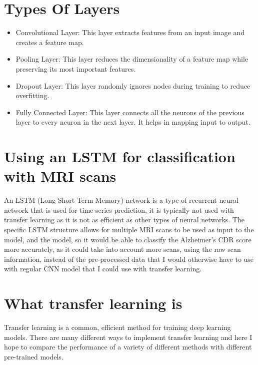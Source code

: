 \documentclass[]{final_report}
\begin{document}
\section{Types Of Layers}

\begin{itemize}
  \item Convolutional Layer: This layer extracts features from an input image and creates a feature map.

  \item  Pooling Layer: This layer reduces the dimensionality of a feature map while preserving its most important features.

  \item  Dropout Layer: This layer randomly ignores nodes during training to reduce overfitting.

  \item  Fully Connected Layer: This layer connects all the neurons of the previous layer to every neuron in the next layer. It helps in mapping input to output.
\end{itemize}


\section{Using an LSTM for classification with MRI scans}
An LSTM (Long Short Term Memory) network is a type of recurrent neural network that is used for time series prediction, it is typically not used with transfer learning as it is not as efficient as other types of neural networks. The specific LSTM structure allows for multiple MRI scans to be used as input to the model, and the model, so it would be able to classify the Alzheimer's CDR score more accurately, as it could take into account more scans, using the raw scan information, instead of the pre-processed data that I would otherwise have to use with regular CNN model that I could use with transfer learning.


\section{What transfer learning is}
Transfer learning is a common, efficient method for training deep learning models.
There are many different ways to implement transfer learning and here I hope to compare the performance
of a variety of different methods with different pre-trained models.
\end{document}
